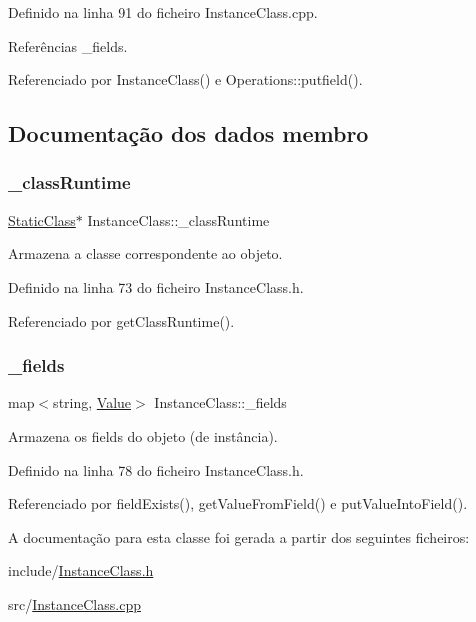 Definido na linha 91 do ficheiro Instance\+Class.\+cpp.



Referências \+\_\+fields.



Referenciado por Instance\+Class() e Operations\+::putfield().



\subsection{Documentação dos dados membro}
\mbox{\label{classInstanceClass_aa8ed961b694f26f470dc2399532d3538}} 
\subsubsection{\texorpdfstring{\+\_\+class\+Runtime}{\_classRuntime}}
{\footnotesize\ttfamily \hyperlink{classStaticClass}{Static\+Class}$\ast$ Instance\+Class\+::\+\_\+class\+Runtime\hspace{0.3cm}{\ttfamily [private]}}

Armazena a classe correspondente ao objeto. 

Definido na linha 73 do ficheiro Instance\+Class.\+h.



Referenciado por get\+Class\+Runtime().

\mbox{\label{classInstanceClass_a603a0866f5113d16ff8f80b5d6bf152b}} 
\subsubsection{\texorpdfstring{\+\_\+fields}{\_fields}}
{\footnotesize\ttfamily map$<$string, \hyperlink{structValue}{Value}$>$ Instance\+Class\+::\+\_\+fields\hspace{0.3cm}{\ttfamily [private]}}

Armazena os fields do objeto (de instância). 

Definido na linha 78 do ficheiro Instance\+Class.\+h.



Referenciado por field\+Exists(), get\+Value\+From\+Field() e put\+Value\+Into\+Field().



A documentação para esta classe foi gerada a partir dos seguintes ficheiros\+:\begin{DoxyCompactItemize}
\item 
include/\hyperlink{InstanceClass_8h}{Instance\+Class.\+h}\item 
src/\hyperlink{InstanceClass_8cpp}{Instance\+Class.\+cpp}\end{DoxyCompactItemize}
